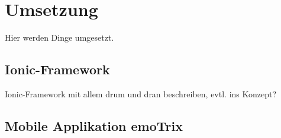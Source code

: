 \section{Umsetzung}
Hier werden Dinge umgesetzt.
\subsection{Ionic-Framework}
Ionic-Framework mit allem drum und dran beschreiben, evtl. ins Konzept?
\subsection{Mobile Applikation emoTrix}